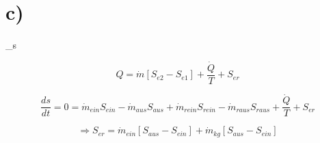 

\section*{c)}

 _s

\[
Q = \dot{m} [S_{e2} - S_{e1}] + \frac{\dot{Q}}{T} + S_{er}
\]

\[
\frac{ds}{dt} = 0 = \dot{m}_{ein} S_{ein} - \dot{m}_{aus} S_{aus} + \dot{m}_{rein} S_{rein} - \dot{m}_{raus} S_{raus} + \frac{\dot{Q}}{T} + S_{er}
\]

\[
\Rightarrow S_{er} = \dot{m}_{ein} [S_{aus} - S_{ein}] + \dot{m}_{kg} [S_{aus} - S_{ein}]
\]